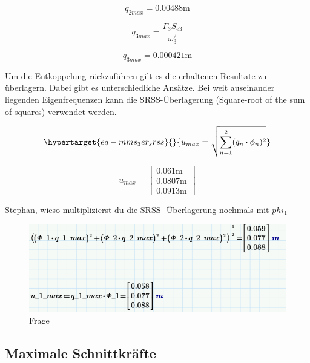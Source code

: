 \documentclass[
  letterpaper,
  DIV=11]{scrreprt}
\begin{document}
\begin{equation}q_{2 max} = 0.00488 \text{m}\end{equation}

\begin{equation}q_{3 max} = \frac{\Gamma_{3} S_{e 3}}{\omega_{3}^{2}}\end{equation}

\begin{equation}q_{3 max} = 0.000421 \text{m}\end{equation}

Um die Entkoppelung rückzuführen gilt es die erhaltenen Resultate zu
überlagern. Dabei gibt es unterschiedliche Ansätze. Bei weit auseinander
liegenden Eigenfrequenzen kann die SRSS-Überlagerung (Square-root of the
sum of squares) verwendet werden.

\begin{equation}\protect\hypertarget{eq-mms_3er_srss}{}{
u_{max} = \sqrt{\sum_{n=1}^2 (q_{n} \cdot \phi_n)^2}
}\label{eq-mms_3er_srss}\end{equation}

\begin{equation}u_{max} = \left[\begin{matrix}0.061 \text{m}\\0.0807 \text{m}\\0.0913 \text{m}\end{matrix}\right]\end{equation}

\ul{Stephan, wieso multiplizierst du die SRSS- Überlagerung nochmals
mit} \(phi_1\)

\begin{figure}[H]

{\centering \includegraphics{bilder/Frage_1.png}

}

\caption{Frage}

\end{figure}

\hypertarget{maximale-schnittkruxe4fte}{%
\subsection{Maximale Schnittkräfte}\label{maximale-schnittkruxe4fte}}
\end{document}
